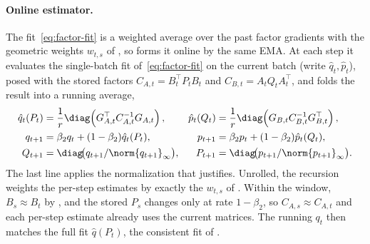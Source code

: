 \paragraph{Online estimator.}
The fit~\eqref{eq:factor-fit} is a weighted average over the past factor
gradients with the geometric weights $w_{t,s}$ of
, so \methodname{} forms it online by the same
EMA. At each step it evaluates the single-batch fit
of~\eqref{eq:factor-fit} on the current batch (write
$\hat{q}_t,\hat{p}_t$), posed with the stored factors
$C_{A,t}=B_t^\top P_tB_t$ and $C_{B,t}=A_tQ_tA_t^\top$, and folds the
result into a running average,
\begin{equation}\label{eq:ours-klcoupling}
\begin{aligned}
  \hat{q}_t(P_t) &= \frac1r\diag\!\left(G_{A,t}^\top C_{A,t}^{-1}G_{A,t}\right),
  &
  \hat{p}_t(Q_t) &= \frac1r\diag\!\left(G_{B,t} C_{B,t}^{-1}G_{B,t}^\top\right),
  \\
  q_{t+1} &= \beta_2q_t+(1-\beta_2)\hat{q}_t(P_t),
  &
  p_{t+1} &= \beta_2p_t+(1-\beta_2)\hat{p}_t(Q_t),
  \\
  Q_{t+1} &= \diag\!\bigl(q_{t+1}/\norm{q_{t+1}}_\infty\bigr),
  &
  P_{t+1} &= \diag\!\bigl(p_{t+1}/\norm{p_{t+1}}_\infty\bigr).
\end{aligned}
\end{equation}
The last line applies the normalization that 
justifies. Unrolled, the recursion weights the per-step estimates by
exactly the $w_{t,s}$ of . Within the window,
$B_s\approx B_t$ by , and
the stored $P_s$ changes only at rate $1-\beta_2$, so
$C_{A,s}\approx C_{A,t}$ and each per-step estimate already uses the
current matrices. The running $q_t$ then matches the full fit
$\hat{q}(P_t)$, the consistent fit of .

